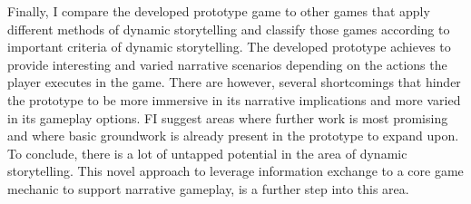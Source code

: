 Finally, I compare the developed prototype game to other games that apply different methods of dynamic storytelling and classify those games according to important criteria of dynamic storytelling. The developed prototype achieves to provide interesting and varied narrative scenarios depending on the actions the player executes in the game. There are however, several shortcomings that hinder the prototype to be more immersive in its narrative implications and more varied in its gameplay options. FI suggest areas where further work is most promising and where basic groundwork is already present in the prototype to expand upon.\\
To conclude, there is a lot of untapped potential in the area of dynamic storytelling. This novel approach to leverage information exchange to a core game mechanic to support narrative gameplay, is a further step into this area.